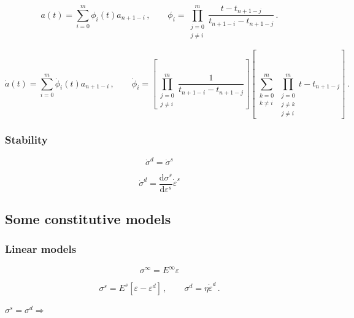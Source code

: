 \documentclass[12pt]{article}
\newcommand{\der}[2]{\dfrac{\text{d} #1}{\text{d} #2}}
\begin{document}
\begin{equation}
	a\left(t\right) = \sum_{i=0}^{m}\phi_{i}\left(t\right)a_{n+1-i}\,, \qquad \phi_{i} = \prod_{\substack{j=0\\ j\neq i}}^{m}\dfrac{t - t_{n+1-j}}{t_{n+1-i} - t_{n+1-j}}\,.
\end{equation}

\begin{equation}
	\dot{a}\left(t\right) = \sum_{i=0}^{m}\dot{\phi}_{i}\left(t\right)a_{n+1-i}\,, \qquad \dot{\phi}_{i} = \left[\prod_{\substack{j=0\\ j\neq i}}^{m}\dfrac{1}{t_{n+1-i} - t_{n+1-j}}\right]\left[\sum_{\substack{k=0\\ k\neq i}}^{m}\prod_{\substack{j=0\\ j\neq k\\j\neq i}}^{m} t - t_{n+1-j}\right]\,.
\end{equation}

\subsubsection{Stability}

\begin{equation}
	\dot{\sigma}^{d} = \dot{\sigma}^{s}
\end{equation}

\begin{equation}
	\dot{\sigma}^{d} = \der{\sigma^{s}}{\varepsilon^{s}}\dot{\varepsilon}^{s}
\end{equation}

\subsection{Some constitutive models}

\subsubsection{Linear models}

\begin{equation}
	\sigma^{\infty} = E^{\infty}\varepsilon
\end{equation}

\begin{equation}
	\sigma^{s} = E^{s}\left[\varepsilon-\varepsilon^{d}\right]\,, \qquad \sigma^{d} = \eta \dot{\varepsilon}^{d}\,.
\end{equation}

$\sigma^{s} = \sigma^{d} \Rightarrow$
\end{document}
